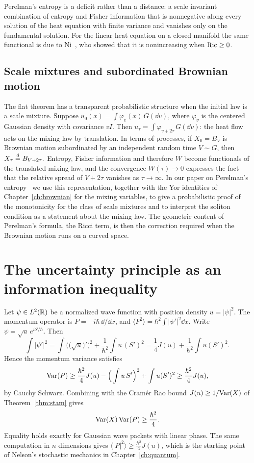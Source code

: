 Perelman's entropy is a deficit rather than a distance: a scale invariant combination of entropy and Fisher information that is nonnegative along every solution of the heat equation with finite variance and vanishes only on the fundamental solution. For the linear heat equation on a closed manifold the same functional is due to Ni~\cite{ni2004}, who showed that it is nonincreasing when $\mathrm{Ric}\geq0$.

\subsection{Scale mixtures and subordinated Brownian motion}
\label{sec:scalemixtures}

The flat theorem has a transparent probabilistic structure when the initial law is a scale mixture. Suppose $u_0(x) = \int\varphi_v(x)\,G(\dd v)$, where $\varphi_v$ is the centered Gaussian density with covariance $vI$. Then $u_\tau = \int\varphi_{v+2\tau}\,G(\dd v)$: the heat flow acts on the mixing law by translation. In terms of processes, if $X_0 = B_V$ is Brownian motion subordinated by an independent random time $V\sim G$, then $X_\tau\stackrel{d}{=} B_{V+2\tau}$. Entropy, Fisher information and therefore $W$ become functionals of the translated mixing law, and the convergence $W(\tau)\to0$ expresses the fact that the relative spread of $V+2\tau$ vanishes as $\tau\to\infty$. In our paper on Perelman's entropy~\cite{polsonsokolovperelman} we use this representation, together with the Yor identities of Chapter~\ref{ch:brownian} for the mixing variables, to give a probabilistic proof of the monotonicity for the class of scale mixtures and to interpret the soliton condition as a statement about the mixing law. The geometric content of Perelman's formula, the Ricci term, is then the correction required when the Brownian motion runs on a curved space.

\section{The uncertainty principle as an information inequality}

Let $\psi\in L^2(\mathbb{R})$ be a normalized wave function with position density $u = |\psi|^2$. The momentum operator is $P = -i\hbar\,\dd/\dd x$, and $\langle P^2\rangle = \hbar^2\int|\psi'|^2\dd x$. Write $\psi = \sqrt u\,e^{iS/\hbar}$. Then
\[
\int|\psi'|^2 = \int\Big(\big(\sqrt u\big)'\Big)^2+\frac{1}{\hbar^2}\int u\,(S')^2 = \frac14J(u)+\frac{1}{\hbar^2}\int u(S')^2.
\]
Hence the momentum variance satisfies
\[
\mathrm{Var}(P)\geq\frac{\hbar^2}{4}J(u)-\Big(\int u\,S'\Big)^2+\int u(S')^2\geq\frac{\hbar^2}{4}J(u),
\]
by Cauchy Schwarz. Combining with the Cram\'er Rao bound $J(u)\geq1/\mathrm{Var}(X)$ of Theorem~\ref{thm:stam} gives
\[
\mathrm{Var}(X)\,\mathrm{Var}(P)\geq\frac{\hbar^2}{4}.
\]
Equality holds exactly for Gaussian wave packets with linear phase. The same computation in $n$ dimensions gives $\langle|P|^2\rangle\geq\frac{\hbar^2}{4}J(u)$, which is the starting point of Nelson's stochastic mechanics in Chapter~\ref{ch:quantum}.

